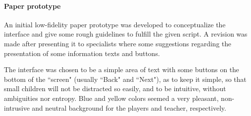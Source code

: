 \documentclass[runningheads]{llncs}
\begin{document}
\paragraph{Paper prototype} An initial low-fidelity paper prototype was developed to conceptualize the interface and give some rough guidelines to fulfill the given script. A revision was made after presenting it to specialists where some suggestions regarding the presentation of some information texts and buttons.
\par The interface was chosen to be a simple area of text with some buttons on the bottom of the ``screen" (usually ``Back" and ``Next"), as to keep it simple, so that small children will not be distracted so easily, and to be intuitive, without ambiguities nor entropy. Blue and yellow colors seemed a very pleasant, non-intrusive and neutral background for the players and teacher, respectively.
\end{document}
